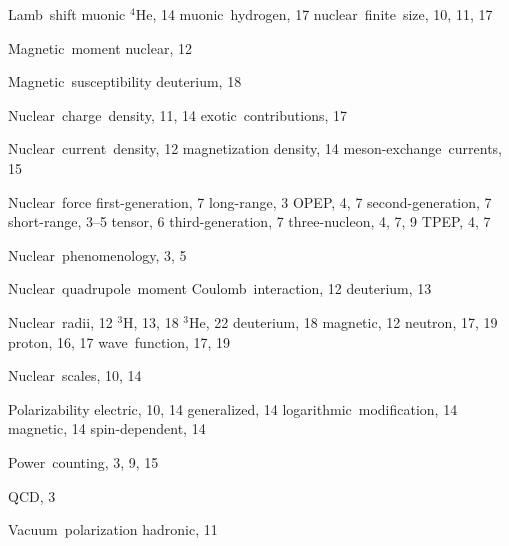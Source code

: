 \documentclass{svmult}
\begin{document}
\begin{theindex}
  \indexspace

  \item Lamb~shift
    \subitem muonic $^4$He, 14
    \subitem muonic~hydrogen, 17
    \subitem nuclear~finite~size, 10, 11, 17

  \indexspace

  \item Magnetic~moment
    \subitem nuclear, 12
  \item Magnetic~susceptibility
    \subitem deuterium, 18

  \indexspace

  \item Nuclear~charge~density, 11, 14
    \subitem exotic~contributions, 17
  \item Nuclear~current~density, 12
    \subitem magnetization density, 14
    \subitem meson-exchange~currents, 15
  \item Nuclear~force
    \subitem first-generation, 7
    \subitem long-range, 3
    \subitem OPEP, 4, 7
    \subitem second-generation, 7
    \subitem short-range, 3--5
    \subitem tensor, 6
    \subitem third-generation, 7
    \subitem three-nucleon, 4, 7, 9
    \subitem TPEP, 4, 7
  \item Nuclear~phenomenology, 3, 5
  \item Nuclear~quadrupole~moment
    \subitem Coulomb~interaction, 12
    \subitem deuterium, 13
  \item Nuclear~radii, 12
    \subitem $^3$H, 13, 18
    \subitem $^3$He, 22
    \subitem deuterium, 18
    \subitem magnetic, 12
    \subitem neutron, 17, 19
    \subitem proton, 16, 17
    \subitem wave~function, 17, 19
  \item Nuclear~scales, 10, 14

  \indexspace

  \item Polarizability
    \subitem electric, 10, 14
    \subitem generalized, 14
    \subitem logarithmic~modification, 14
    \subitem magnetic, 14
    \subitem spin-dependent, 14
  \item Power~counting, 3, 9, 15

  \indexspace

  \item QCD, 3

  \indexspace

  \item Vacuum~polarization
    \subitem hadronic, 11

\end{theindex}
\end{document}
